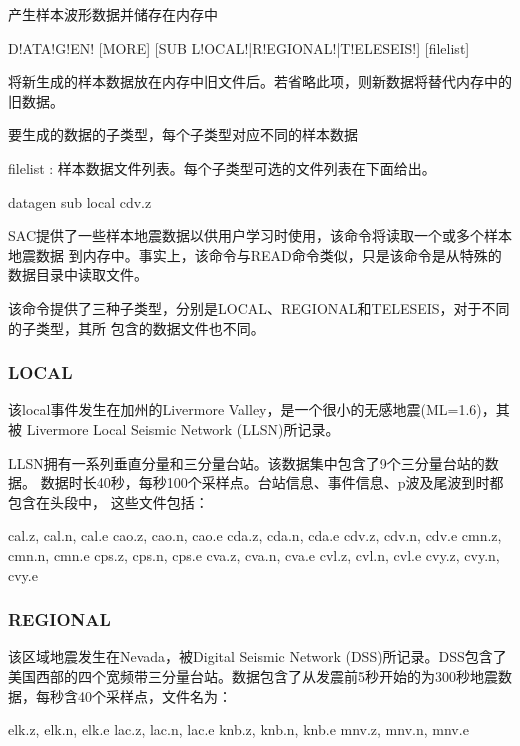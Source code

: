 \label{cmd:datagen}

产生样本波形数据并储存在内存中

\begin{SACSTX}
D!ATA!G!EN! [MORE] [SUB L!OCAL!|R!EGIONAL!|T!ELESEIS!] [filelist]
\end{SACSTX}

\begin{description}
\item [MORE] 将新生成的样本数据放在内存中旧文件后。若省略此项，则新数据将替代内存中的旧数据。
\item [SUB LOCAL|REGIONAL|TELESEIS] 要生成的数据的子类型，每个子类型对应不同的样本数据
\item filelist : 样本数据文件列表。每个子类型可选的文件列表在下面给出。
\end{description}

\begin{SACDFT}
datagen sub local cdv.z
\end{SACDFT}

SAC提供了一些样本地震数据以供用户学习时使用，该命令将读取一个或多个样本地震数据
到内存中。事实上，该命令与READ命令类似，只是该命令是从特殊的数据目录中读取文件。

该命令提供了三种子类型，分别是LOCAL、REGIONAL和TELESEIS，对于不同的子类型，其所
包含的数据文件也不同。

\subsubsection*{LOCAL}
该local事件发生在加州的Livermore Valley，是一个很小的无感地震(ML=1.6)，其被
Livermore Local Seismic Network (LLSN)所记录。

LLSN拥有一系列垂直分量和三分量台站。该数据集中包含了9个三分量台站的数据。
数据时长40秒，每秒100个采样点。台站信息、事件信息、p波及尾波到时都包含在头段中，
这些文件包括：
\begin{SACCode}
    cal.z, cal.n, cal.e
    cao.z, cao.n, cao.e
    cda.z, cda.n, cda.e
    cdv.z, cdv.n, cdv.e
    cmn.z, cmn.n, cmn.e
    cps.z, cps.n, cps.e
    cva.z, cva.n, cva.e
    cvl.z, cvl.n, cvl.e
    cvy.z, cvy.n, cvy.e
\end{SACCode}

\subsubsection*{REGIONAL}
该区域地震发生在Nevada，被Digital Seismic Network (DSS)所记录。DSS包含了美国西部的四个宽频带三分量台站。数据包含了从发震前5秒开始的为300秒地震数据，每秒含40个采样点，文件名为：
\begin{SACCode}
    elk.z, elk.n, elk.e
    lac.z, lac.n, lac.e
    knb.z, knb.n, knb.e
    mnv.z, mnv.n, mnv.e
\end{SACCode}

